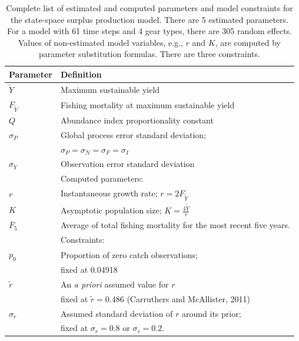 \documentclass[12pt,letterpaper]{article}
\newcommand\MSY{\widetilde{Y}}
\newcommand\Fmsy{F_{\MSY}}
\begin{document}
\begin{table}
\caption{Complete list of estimated and computed parameters and model
constraints for 
the state-space surplus production model. There are 5 estimated parameters. 
For a model with 61 time steps and 4 gear types, there are 305 random effects.
Values of non-estimated model variables, e.g.,  $r$ and $K$, are computed by
parameter substitution formulas.
There are three constraints.
}
\label{tab:allvars1}
\begin{center}
\begin{tabular}{ll}
\hline
Parameter & Definition\\
\hline
\hline
$\MSY$ & Maximum sustainable yield\\
$\Fmsy$& Fishing mortality at maximum sustainable yield\\
$Q$    & Abundance index proportionality constant\\
$\sigma_P$ & Global process error standard deviation;\\
           & $\sigma_P=\sigma_N=\sigma_F=\sigma_I$\\
$\sigma_Y$ & Observation error standard deviation \\
\hline
       & Computed parameters:\\
$r$    & Instantaneous growth rate; $r=2F_{\MSY}$\\
$K$    & Asymptotic population size; $K=\frac{4\MSY}{r}$\\
$\bar{F}_5$ & Average of total fishing mortality for the most recent
five years.\\
\hline
       & Constraints:\\
$p_0$  & Proportion of zero catch observations;\\
       & fixed at 0.04918\\
$\tilde{r}$ & An {\it a priori} assumed value for $r$\\
            & fixed at $\tilde{r}=0.486$ (Carruthers and McAllister, 2011)\\
$\sigma_r$  & Assumed standard deviation of $r$ around its prior;\\
            & fixed at $\sigma_r=0.8$ or $\sigma_r=0.2$.\\
\hline
\end{tabular}
\end{center}
\end{table}
\end{document}
